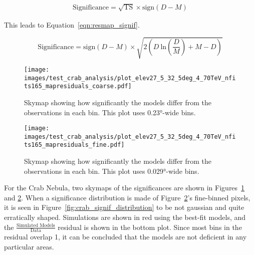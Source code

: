   \begin{equation}
    \begin{split}
      \textrm{Significance} = \sqrt{\textrm{TS}} \times \textrm{sign} \left ( D - M \right )
    \end{split}
  \end{equation}
  
  This leads to Equation~\ref{eqn:resmap_signif}.
  
  \begin{equation}\label{eqn:resmap_signif}
    \textrm{Significance} = \textrm{sign}(D-M) \times \sqrt{ 2 \left ( D \: \textrm{ln} \left ( \frac{D}{M} \right ) + M - D \right ) }
  \end{equation}
  
  
  \begin{figure}[t]
    \centering
    \texttt{[image: images/test\_crab\_analysis/plot\_elev27\_5\_32\_5deg\_4\_70TeV\_nfits165\_mapresiduals\_coarse.pdf]}
    \caption[Crab Residual Skymap Coarse Binning]{
      Skymap showing how significantly the models differ from the observations in each bin.
      This plot uses \ang{0.23}-wide bins.}
    \label{fig:crab_signif_skymap_coarse}
  \end{figure}
  
  \begin{figure}[b]
    \centering
    \texttt{[image: images/test\_crab\_analysis/plot\_elev27\_5\_32\_5deg\_4\_70TeV\_nfits165\_mapresiduals\_fine.pdf]}
    \caption[Crab Residual Skymap Fine Binning]{
      Skymap showing how significantly the models differ from the observations in each bin.
      This plot uses \ang{0.029}-wide bins.}
    \label{fig:crab_signif_skymap_fine}
  \end{figure}

  For the Crab Nebula, two skymaps of the significances are shown in Figures~\ref{fig:crab_signif_skymap_coarse} and \ref{fig:crab_signif_skymap_fine}.
  When a significance distribution is made of Figure~\ref{fig:crab_signif_skymap_fine}'s fine-binned pixels, it is seen in Figure~\ref{fig:crab_signif_distribution} to be not gaussian and quite erratically shaped.
  Simulations are shown in red using the best-fit models, and the $\frac{\textrm{Simulated Models}}{\textrm{Data}}$ residual is shown in the bottom plot.
  Since most bins in the residual overlap 1, it can be concluded that the models are not deficient in any particular areas.
  
